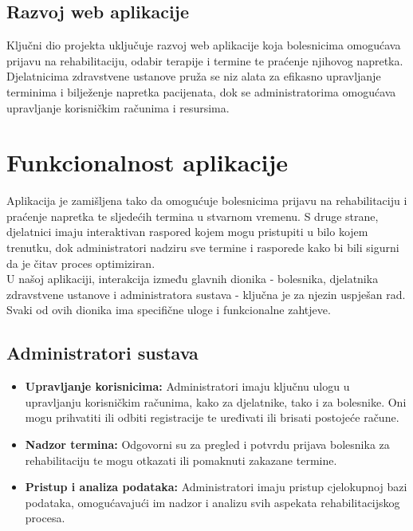         \subsection*{\textbf{\large Razvoj web aplikacije}}
        Ključni dio projekta uključuje razvoj web aplikacije koja bolesnicima omogućava prijavu na rehabilitaciju, odabir terapije i termine te praćenje njihovog napretka. Djelatnicima zdravstvene ustanove pruža se niz alata za efikasno upravljanje terminima i bilježenje napretka pacijenata, dok se administratorima omogućava upravljanje korisničkim računima i resursima.


        \section*{Funkcionalnost aplikacije}

        Aplikacija je zamišljena tako da omogućuje bolesnicima prijavu na rehabilitaciju i praćenje napretka te sljedećih termina u stvarnom vremenu. S druge strane, djelatnici imaju interaktivan raspored kojem mogu pristupiti u bilo kojem trenutku, dok administratori nadziru sve termine i rasporede kako bi bili sigurni da je čitav proces optimiziran. \\
        
        U našoj aplikaciji, interakcija između glavnih dionika - bolesnika, djelatnika zdravstvene ustanove i administratora sustava - ključna je za njezin uspješan rad. Svaki od ovih dionika ima specifične uloge i funkcionalne zahtjeve.
        
        \subsection*{Administratori sustava}
        \begin{itemize}
            \item \textbf{Upravljanje korisnicima:} Administratori imaju ključnu ulogu u upravljanju korisničkim računima, kako za djelatnike, tako i za bolesnike. Oni mogu prihvatiti ili odbiti registracije te uređivati ili brisati postojeće račune.
            
            \item \textbf{Nadzor termina:} Odgovorni su za pregled i potvrdu prijava bolesnika za rehabilitaciju te mogu otkazati ili pomaknuti zakazane termine.
        
            \item \textbf{Pristup i analiza podataka:} Administratori imaju pristup cjelokupnoj bazi podataka, omogućavajući im nadzor i analizu svih aspekata rehabilitacijskog procesa.
        \end{itemize}
        
